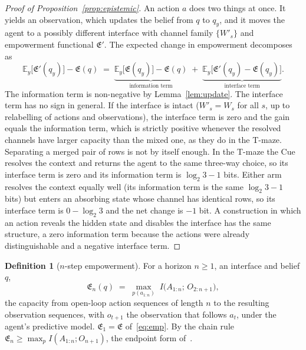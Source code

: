 \documentclass[letterpaper]{article} %
\theoremstyle{definition}
\newtheorem{definition}{Definition}
\providecommand{\E}{\mathbb{E}}
\providecommand{\Emp}{\mathfrak{E}}
\begin{document}
\begin{proof}[Proof of Proposition~\ref{prop:epistemic}]
An action $a$ does two things at once. It yields an observation, which updates the belief from $q$ to $q_y$, and it moves the agent to a possibly different interface with channel family $\{W'_s\}$ and empowerment functional $\Emp'$. The expected change in empowerment decomposes as
\begin{equation}
  \E_y\big[\Emp'(q_y)\big] - \Emp(q)
  \;=\;
  \underbrace{\E_y\big[\Emp(q_y)\big] - \Emp(q)}_{\text{information term}}
  \;+\;
  \underbrace{\E_y\big[\Emp'(q_y) - \Emp(q_y)\big]}_{\text{interface term}} .
  \label{eq:decomp}
\end{equation}
The information term is non-negative by Lemma~\ref{lem:update}. The interface term has no sign in general. If the interface is intact ($W'_s = W_s$ for all $s$, up to relabelling of actions and observations), the interface term is zero and the gain equals the information term, which is strictly positive whenever the resolved channels have larger capacity than the mixed one, as they do in the T-maze. Separating a merged pair of rows is not by itself enough. In the T-maze the Cue resolves the context and returns the agent to the same three-way choice, so its interface term is zero and its information term is $\log_2 3 - 1$ bits. Either arm resolves the context equally well (its information term is the same $\log_2 3 - 1$ bits) but enters an absorbing state whose channel has identical rows, so its interface term is $0 - \log_2 3$ and the net change is $-1$ bit. A construction in which an action reveals the hidden state and disables the interface has the same structure, a zero information term because the actions were already distinguishable and a negative interface term.
\end{proof}

\begin{definition}[$n$-step empowerment]
For a horizon $n \ge 1$, an interface and belief $q$,
\begin{equation}
  \Emp_n(q) \;=\; \max_{p(a_{1:n})}\; I\big(A_{1:n};\, O_{2:n+1}\big),
\end{equation}
the capacity from open-loop action sequences of length $n$ to the resulting observation sequences, with $o_{t+1}$ the observation that follows $a_t$, under the agent's predictive model. $\Emp_1 = \Emp$ of~\eqref{eq:emp}. By the chain rule $\Emp_n \ge \max_p I(A_{1:n}; O_{n+1})$, the endpoint form of~\citet{Klyubin2005empowerment}.
\end{definition}
\end{document}
